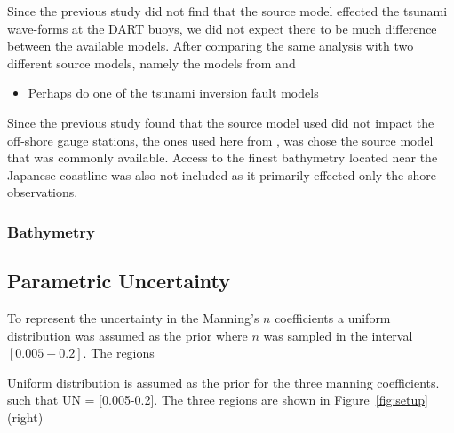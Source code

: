 Since the previous study \cite{MacInnes:2013cr} did not find that the source model effected the tsunami wave-forms at the DART buoys, we did not expect there to be much difference between the available models.  After comparing the same analysis with two different source models, namely the models from \cite{Ammon:2011dm} and

\begin{itemize}
    \item Perhaps do one of the tsunami inversion fault models
\end{itemize}

Since the previous study found that the source model used did not impact the off-shore gauge stations, the ones used here from \cite{Ammon:2011dm}, was chose the source model that was commonly available.  Access to the finest bathymetry located near the Japanese coastline was also not included as it primarily effected only the shore observations.

\subsubsection{Bathymetry}

\subsection{Parametric Uncertainty}
To represent the uncertainty in the Manning's $n$ coefficients a uniform distribution was assumed as the prior where $n$ was sampled in the interval $[0.005-0.2]$.  The regions

Uniform distribution is assumed as the prior for the three manning coefficients.
such that UN = [0.005-0.2]. The three regions are shown in Figure~\ref{fig:setup}(right)
